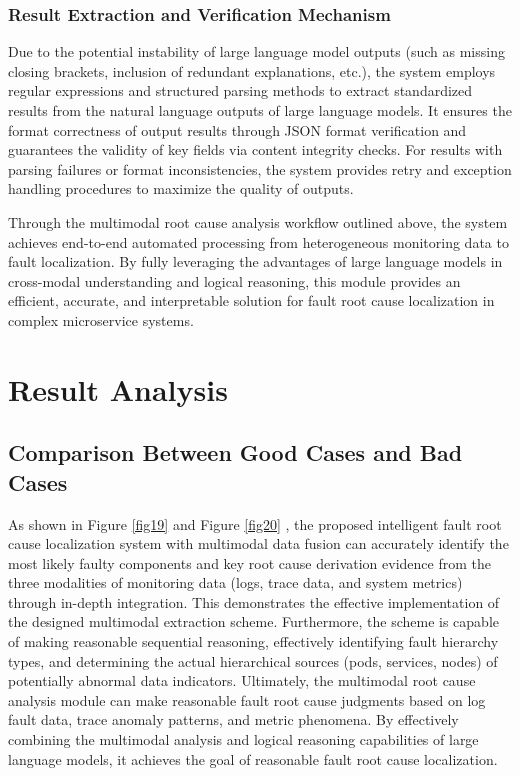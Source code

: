\documentclass[10pt]{article}
\let\oldref\ref
\renewcommand{\ref}[1]{%
    \textcolor{blue}{\oldref{#1}}%
}
\begin{document}
\subsubsection{Result Extraction and Verification Mechanism}

Due to the potential instability of large language model outputs (such as missing closing brackets, inclusion of redundant explanations, etc.), the system employs regular expressions and structured parsing methods to extract standardized results from the natural language outputs of large language models. It ensures the format correctness of output results through JSON format verification and guarantees the validity of key fields via content integrity checks. For results with parsing failures or format inconsistencies, the system provides retry and exception handling procedures to maximize the quality of outputs.

Through the multimodal root cause analysis workflow outlined above, the system achieves end-to-end automated processing from heterogeneous monitoring data to fault localization. By fully leveraging the advantages of large language models in cross-modal understanding and logical reasoning, this module provides an efficient, accurate, and interpretable solution for fault root cause localization in complex microservice systems.


\section{Result Analysis}

\subsection{Comparison Between Good Cases and Bad Cases}

As shown in Figure \ref{fig19} and Figure \ref{fig20}, the proposed intelligent fault root cause localization system with multimodal data fusion can accurately identify the most likely faulty components and key root cause derivation evidence from the three modalities of monitoring data (logs, trace data, and system metrics) through in-depth integration. This demonstrates the effective implementation of the designed multimodal extraction scheme. Furthermore, the scheme is capable of making reasonable sequential reasoning, effectively identifying fault hierarchy types, and determining the actual hierarchical sources (pods, services, nodes) of potentially abnormal data indicators. Ultimately, the multimodal root cause analysis module can make reasonable fault root cause judgments based on log fault data, trace anomaly patterns, and metric phenomena. By effectively combining the multimodal analysis and logical reasoning capabilities of large language models, it achieves the goal of reasonable fault root cause localization.
\end{document}
